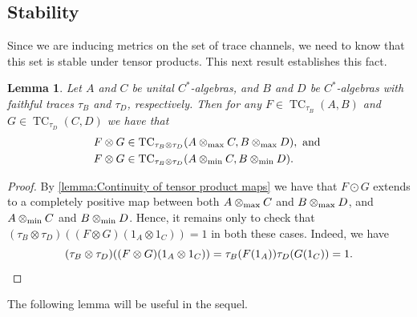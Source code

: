 \documentclass[11pt, a4paper, oneside, final, reqno]{amsart}
\newcommand{\TC}{\operatorname{TC}}
\theoremstyle{definition}
\theoremstyle{plain}
\newtheorem{lemma}[definition]{Lemma}
\theoremstyle{remark}
\numberwithin{equation}{section}
\begin{document}
\subsection{Stability}\label{sec:stability}

Since we are inducing metrics on the set of trace channels, we need to know that this set is stable under tensor products. This next result establishes this fact.

\begin{lemma}\label{lemma:tensor or trace channels}
    Let $A$ and $C$ be unital $C^*$-algebras, and $B$ and $D$ be $C^*$-algebras with faithful traces $\tau_B$ and $\tau_D$, respectively. Then for any $F \in \TC_{\tau_B}(A,B)$ and $G \in \TC_{\tau_D}(C,D)$ we have that
    \begin{align*}
        F \otimes G & \in \TC_{\tau_B \otimes \tau_D}(A \otimes_{\rm max} C, B \otimes_{\rm max} D), \text{ and } \\
        F \otimes G & \in \TC_{\tau_B \otimes \tau_D}(A \otimes_{\rm min} C, B \otimes_{\rm min} D).
    \end{align*}
\end{lemma}
\begin{proof}
    By \cref{lemma:Continuity of tensor product maps} we have that $F \odot G$ extends to a completely positive map between both $A \otimes_{\rm max} C$ and $B \otimes_{\rm max} D$, and $A \otimes_{\rm min} C$ and $B \otimes_{\rm min} D$. Hence, it remains only to check that $(\tau_B \otimes \tau_D)((F \otimes G)(1_A \otimes 1_C)) = 1$ in both these cases. Indeed, we have
    \begin{equation*}
        (\tau_B \otimes \tau_D)((F \otimes G)(1_A \otimes 1_C))
        = \tau_B(F(1_A))\tau_D(G(1_C))
        = 1. \qedhere
    \end{equation*}
\end{proof}

The following lemma will be useful in the sequel.
\end{document}
